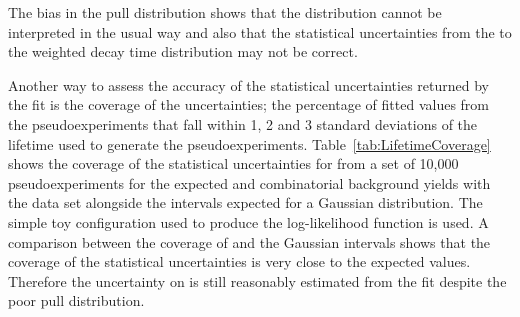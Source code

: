 %                                                                                                                                                





The bias in the \tmumu pull distribution shows that the distribution cannot be interpreted in the usual way and also that the statistical uncertainties from the \ml to the weighted decay time distribution may not be correct. 

Another way to assess the accuracy of the statistical uncertainties returned by the fit is the coverage of the uncertainties; the percentage of fitted \tmumu values from the pseudoexperiments that fall within 1, 2 and 3 standard deviations of the lifetime used to generate the pseudoexperiments. Table~\ref{tab:LifetimeCoverage} shows the coverage of the statistical uncertainties for \tmumu from a set of 10,000 pseudoexperiments for the expected \bsmumu and combinatorial background yields with the data set alongside the intervals expected for a Gaussian distribution. The simple toy configuration used to produce the log-likelihood function is used. A comparison between the coverage of \tmumu and the Gaussian intervals shows that the coverage of the statistical uncertainties is very close to the expected values. Therefore the uncertainty on \tmumu is still reasonably estimated from the fit despite the poor pull distribution.

